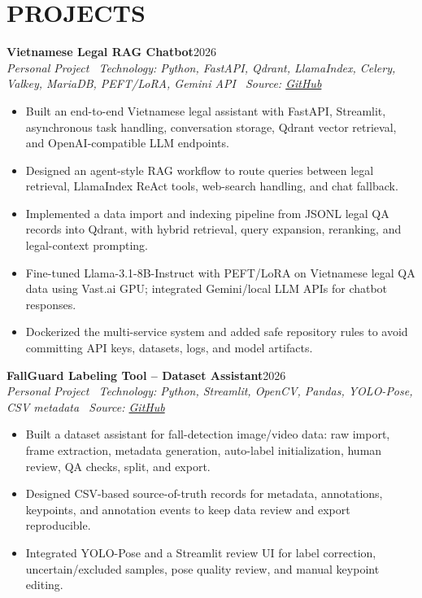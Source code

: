 \documentclass[10pt,a4paper]{article}
\newenvironment{cvitems}{%
    \begin{itemize}[leftmargin=1.25em,itemsep=0pt,topsep=1pt,parsep=0pt]
}{%
    \end{itemize}
}
\newcommand{\entryhead}[2]{%
    \noindent\textbf{#1}\hfill #2\\[-2pt]
}
\newcommand{\entrysub}[1]{%
    \noindent\textit{#1}\\[-1pt]
}
\begin{document}
\section{PROJECTS}
\entryhead{Vietnamese Legal RAG Chatbot}{2026}
\entrysub{Personal Project \textbar\ Technology: Python, FastAPI, Qdrant, LlamaIndex, Celery, Valkey, MariaDB, PEFT/LoRA, Gemini API \textbar\ Source: \href{https://github.com/NguyenKhacBao564/legal_RaG_Chatbot_VietNamese-System}{GitHub}}
\begin{cvitems}
    \item Built an end-to-end Vietnamese legal assistant with FastAPI, Streamlit, asynchronous task handling, conversation storage, Qdrant vector retrieval, and OpenAI-compatible LLM endpoints.
    \item Designed an agent-style RAG workflow to route queries between legal retrieval, LlamaIndex ReAct tools, web-search handling, and chat fallback.
    \item Implemented a data import and indexing pipeline from JSONL legal QA records into Qdrant, with hybrid retrieval, query expansion, reranking, and legal-context prompting.
    \item Fine-tuned Llama-3.1-8B-Instruct with PEFT/LoRA on Vietnamese legal QA data using Vast.ai GPU; integrated Gemini/local LLM APIs for chatbot responses.
    \item Dockerized the multi-service system and added safe repository rules to avoid committing API keys, datasets, logs, and model artifacts.
\end{cvitems}

\entryhead{FallGuard Labeling Tool -- Dataset Assistant}{2026}
\entrysub{Personal Project \textbar\ Technology: Python, Streamlit, OpenCV, Pandas, YOLO-Pose, CSV metadata \textbar\ Source: \href{https://github.com/NguyenKhacBao564/autofall-labeler-tool}{GitHub}}
\begin{cvitems}
    \item Built a dataset assistant for fall-detection image/video data: raw import, frame extraction, metadata generation, auto-label initialization, human review, QA checks, split, and export.
    \item Designed CSV-based source-of-truth records for metadata, annotations, keypoints, and annotation events to keep data review and export reproducible.
    \item Integrated YOLO-Pose and a Streamlit review UI for label correction, uncertain/excluded samples, pose quality review, and manual keypoint editing.
\end{cvitems}
\end{document}
